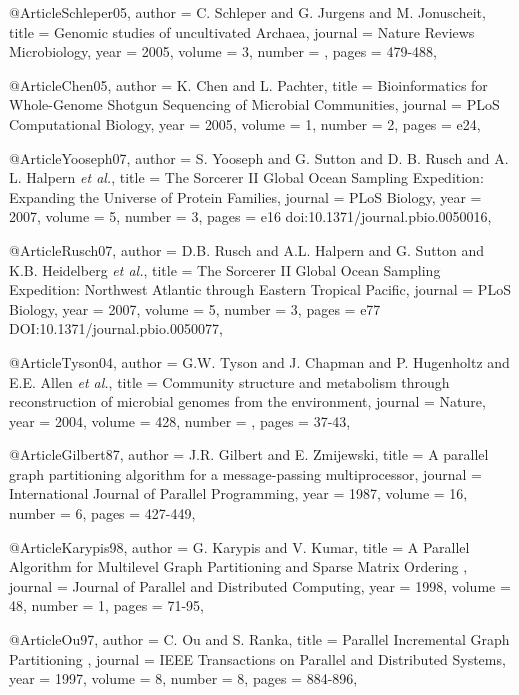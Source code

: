 @Article{Schleper05,
  author = {C. Schleper and G. Jurgens and M. Jonuscheit},
  title =  {{Genomic studies of uncultivated Archaea}},
  journal = {Nature Reviews Microbiology},
  year = {2005},
  volume =  {3},
  number =  {},
  pages =   {479-488},
}

@Article{Chen05,
  author = {K. Chen and L. Pachter},
  title =  {Bioinformatics for Whole-Genome Shotgun Sequencing of Microbial Communities},
  journal = {{PLoS Computational Biology}},
  year = {2005},
  volume =  {1},
  number =  {2},
  pages =   {e24},
}



@Article{Yooseph07,
  author = {S. Yooseph and G. Sutton and D. B. Rusch and A. L. Halpern {\it et al.}},
  title =  {{The Sorcerer II Global Ocean Sampling Expedition: Expanding the Universe of Protein Families}},
  journal = {{PLoS Biology}},
  year = {2007},
  volume =  {5},
  number =  {3},
  pages =   {e16 doi:10.1371/journal.pbio.0050016},
}

@Article{Rusch07,
  author = {D.B. Rusch and A.L. Halpern and G. Sutton and K.B. Heidelberg {\it et al.}},
  title =  {{The Sorcerer II Global Ocean Sampling Expedition: Northwest Atlantic through Eastern Tropical Pacific}},
  journal = {{PLoS Biology}},
  year = {2007},
  volume =  {5},
  number =  {3},
  pages =   {e77 DOI:10.1371/journal.pbio.0050077},
}


@Article{Tyson04,
  author = {G.W. Tyson and J. Chapman and P. Hugenholtz and E.E. Allen {\it et al.}},
  title =  {Community structure and metabolism through reconstruction of microbial genomes from the environment},
  journal = {Nature},
  year = {2004},
  volume =  {428},
  number =  {},
  pages =   {37-43},
}



@Article{Gilbert87,
  author = {J.R. Gilbert and E. Zmijewski},
  title =  {A parallel graph partitioning algorithm for a message-passing multiprocessor},
  journal = {International Journal of Parallel Programming},
  year = {1987},
  volume =  {16},
  number =  {6},
  pages =   {427-449},
}


@Article{Karypis98,
  author = {G. Karypis and V. Kumar},
  title =  {A Parallel Algorithm for Multilevel Graph Partitioning and Sparse Matrix Ordering },
  journal = {Journal of Parallel and Distributed Computing},
  year = {1998},
  volume =  {48},
  number =  {1},
  pages =   {71-95},
}



@Article{Ou97,
  author = {C. Ou and S. Ranka},
  title =  {Parallel Incremental Graph Partitioning },
  journal = {IEEE Transactions on Parallel and Distributed Systems},
  year = {1997},
  volume =  {8},
  number =  {8},
  pages =   {884-896},
}


